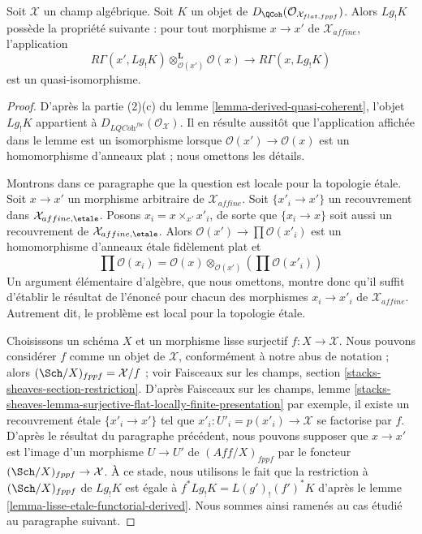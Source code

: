 \begin{lemma}
\label{lemma-higher-shriek-QC}
Soit $\mathcal{X}$ un champ algébrique. Soit $K$ un objet de
$D_\QCoh(\mathcal{O}_{\mathcal{X}_{flat, fppf}})$. Alors $Lg_!K$ possède la
propriété suivante : pour tout morphisme $x \to x'$ de
$\mathcal{X}_{affine}$, l'application
$$
R\Gamma(x', Lg_!K) \otimes_{\mathcal{O}(x')}^\mathbf{L} \mathcal{O}(x)
\longrightarrow
R\Gamma(x, Lg_!K)
$$
est un quasi-isomorphisme.
\end{lemma}

\begin{proof}
D'après la partie (2)(c) du lemme \ref{lemma-derived-quasi-coherent}, l'objet
$Lg_!K$ appartient à
$D_{\textit{LQCoh}^{fbc}}(\mathcal{O}_\mathcal{X})$. Il en résulte aussitôt que
l'application affichée dans le lemme est un isomorphisme lorsque
$\mathcal{O}(x') \to \mathcal{O}(x)$ est un homomorphisme d'anneaux plat ; nous
omettons les détails.

\medskip\noindent
Montrons dans ce paragraphe que la question est locale pour la topologie
étale. Soit $x \to x'$ un morphisme arbitraire de $\mathcal{X}_{affine}$. Soit
$\{x'_i \to x'\}$ un recouvrement dans
$\mathcal{X}_{affine, \etale}$. Posons $x_i = x \times_{x'} x'_i$, de sorte que
$\{x_i \to x\}$ soit aussi un recouvrement de
$\mathcal{X}_{affine, \etale}$. Alors
$\mathcal{O}(x') \to \prod \mathcal{O}(x'_i)$ est un homomorphisme d'anneaux
étale fidèlement plat et
$$
\prod \mathcal{O}(x_i) =
\mathcal{O}(x) \otimes_{\mathcal{O}(x')} \left(\prod \mathcal{O}(x'_i)\right)
$$
Un argument élémentaire d'algèbre, que nous omettons, montre donc qu'il suffit
d'établir le résultat de l'énoncé pour chacun des morphismes
$x_i \to x'_i$ de $\mathcal{X}_{affine}$. Autrement dit, le problème est local
pour la topologie étale.

\medskip\noindent
Choisissons un schéma $X$ et un morphisme lisse surjectif
$f : X \to \mathcal{X}$. Nous pouvons considérer $f$ comme un objet de
$\mathcal{X}$, conformément à notre abus de notation ; alors
$(\Sch/X)_{fppf} = \mathcal{X}/f$ ; voir Faisceaux sur les champs, section
\ref{stacks-sheaves-section-restriction}. D'après Faisceaux sur les champs,
lemme
\ref{stacks-sheaves-lemma-surjective-flat-locally-finite-presentation}
par exemple, il existe un recouvrement étale $\{x'_i \to x'\}$ tel que
$x'_i : U'_i = p(x'_i) \to \mathcal{X}$ se factorise par $f$. D'après le
résultat du paragraphe précédent, nous pouvons supposer que $x \to x'$ est
l'image d'un morphisme $U \to U'$ de $(\textit{Aff}/X)_{fppf}$ par le foncteur
$(\Sch/X)_{fppf} \to \mathcal{X}$. À ce stade, nous utilisons le fait que la
restriction à $(\Sch/X)_{fppf}$ de $Lg_!K$ est égale à
$f^*Lg_!K = L(g')_!(f')^*K$ d'après le lemme
\ref{lemma-lisse-etale-functorial-derived}. Nous sommes ainsi ramenés au cas
étudié au paragraphe suivant.


\end{proof}
